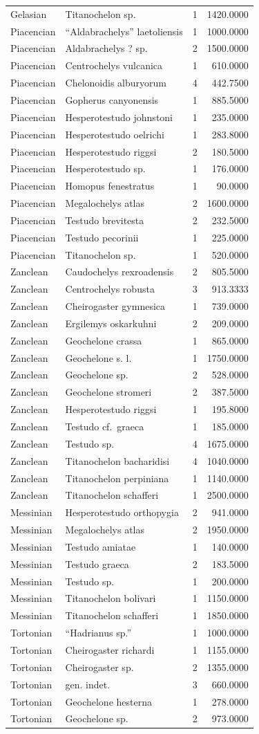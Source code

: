 \documentclass[]{article}
\begin{document}
\begin{longtable}[]{@{}llrr@{}}
Gelasian & Titanochelon sp. & 1 & 1420.0000\tabularnewline
Piacencian & ``Aldabrachelys'' laetoliensis & 1 &
1000.0000\tabularnewline
Piacencian & Aldabrachelys ? sp. & 2 & 1500.0000\tabularnewline
Piacencian & Centrochelys vulcanica & 1 & 610.0000\tabularnewline
Piacencian & Chelonoidis alburyorum & 4 & 442.7500\tabularnewline
Piacencian & Gopherus canyonensis & 1 & 885.5000\tabularnewline
Piacencian & Hesperotestudo johnstoni & 1 & 235.0000\tabularnewline
Piacencian & Hesperotestudo oelrichi & 1 & 283.8000\tabularnewline
Piacencian & Hesperotestudo riggsi & 2 & 180.5000\tabularnewline
Piacencian & Hesperotestudo sp. & 1 & 176.0000\tabularnewline
Piacencian & Homopus fenestratus & 1 & 90.0000\tabularnewline
Piacencian & Megalochelys atlas & 2 & 1600.0000\tabularnewline
Piacencian & Testudo brevitesta & 2 & 232.5000\tabularnewline
Piacencian & Testudo pecorinii & 1 & 225.0000\tabularnewline
Piacencian & Titanochelon sp. & 1 & 520.0000\tabularnewline
Zanclean & Caudochelys rexroadensis & 2 & 805.5000\tabularnewline
Zanclean & Centrochelys robusta & 3 & 913.3333\tabularnewline
Zanclean & Cheirogaster gymnesica & 1 & 739.0000\tabularnewline
Zanclean & Ergilemys oskarkuhni & 2 & 209.0000\tabularnewline
Zanclean & Geochelone crassa & 1 & 865.0000\tabularnewline
Zanclean & Geochelone s. l. & 1 & 1750.0000\tabularnewline
Zanclean & Geochelone sp. & 2 & 528.0000\tabularnewline
Zanclean & Geochelone stromeri & 2 & 387.5000\tabularnewline
Zanclean & Hesperotestudo riggsi & 1 & 195.8000\tabularnewline
Zanclean & Testudo cf.~graeca & 1 & 185.0000\tabularnewline
Zanclean & Testudo sp. & 4 & 1675.0000\tabularnewline
Zanclean & Titanochelon bacharidisi & 4 & 1040.0000\tabularnewline
Zanclean & Titanochelon perpiniana & 1 & 1140.0000\tabularnewline
Zanclean & Titanochelon schafferi & 1 & 2500.0000\tabularnewline
Messinian & Hesperotestudo orthopygia & 2 & 941.0000\tabularnewline
Messinian & Megalochelys atlas & 2 & 1950.0000\tabularnewline
Messinian & Testudo amiatae & 1 & 140.0000\tabularnewline
Messinian & Testudo graeca & 2 & 183.5000\tabularnewline
Messinian & Testudo sp. & 1 & 200.0000\tabularnewline
Messinian & Titanochelon bolivari & 1 & 1150.0000\tabularnewline
Messinian & Titanochelon schafferi & 1 & 1850.0000\tabularnewline
Tortonian & ``Hadrianus sp.'' & 1 & 1000.0000\tabularnewline
Tortonian & Cheirogaster richardi & 1 & 1155.0000\tabularnewline
Tortonian & Cheirogaster sp. & 2 & 1355.0000\tabularnewline
Tortonian & gen. indet. & 3 & 660.0000\tabularnewline
Tortonian & Geochelone hesterna & 1 & 278.0000\tabularnewline
Tortonian & Geochelone sp. & 2 & 973.0000\tabularnewline

\end{longtable}
\end{document}
